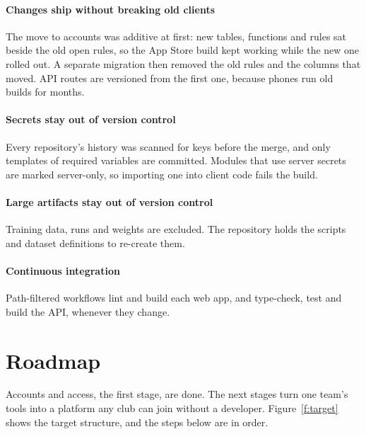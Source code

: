\documentclass[letterpaper,11pt]{article}
\begin{document}
\paragraph{Changes ship without breaking old clients} The move to accounts was additive at first:
new tables, functions and rules sat beside the old open rules, so the App Store build kept working
while the new one rolled out. A separate migration then removed the old rules and the columns that
moved. API routes are versioned from the first one, because phones run old builds for months.

\paragraph{Secrets stay out of version control} Every repository's history was scanned for keys
before the merge, and only templates of required variables are committed. Modules that use
server secrets are marked server-only, so importing one into client code fails the build.

\paragraph{Large artifacts stay out of version control} Training data, runs and weights are
excluded. The repository holds the scripts and dataset definitions to re-create them.

\paragraph{Continuous integration} Path-filtered workflows lint and build each web app, and
type-check, test and build the API, whenever they change.

\section{Roadmap}\label{s:roadmap}

Accounts and access, the first stage, are done. The next stages turn one team's tools into a
platform any club can join without a developer. Figure~\ref{f:target} shows the target structure,
and the steps below are in order.
\end{document}
